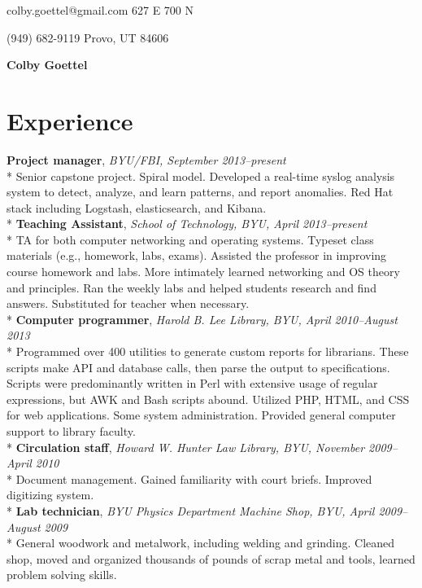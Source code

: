 \documentclass[10pt]{article}
\begin{document}
{\noindent colby.goettel@gmail.com \hfill 627 E 700 N}

{\noindent (949) 682-9119 \hfill Provo, UT 84606}
\begin{center}
    {\bfseries \huge Colby Goettel} \\
\end{center}
\vspace{-18pt}

\section*{Experience}
\textbf{Project manager}, \textit{BYU/FBI, September 2013--present} \\*
Senior capstone project. Spiral model. Developed a real-time syslog analysis system to detect, analyze, and learn patterns, and report anomalies. Red Hat stack including Logstash, elasticsearch, and Kibana. \vspace{0.5em}\\*
\textbf{Teaching Assistant}, \textit{School of Technology, BYU, April 2013--present} \\*
TA for both computer networking and operating systems. Typeset class materials (e.g., homework, labs, exams). Assisted the professor in improving course homework and labs. More intimately learned networking and OS theory and principles. Ran the weekly labs and helped students research and find answers. Substituted for teacher when necessary. \vspace{0.5em}\\*
\textbf{Computer programmer}, \textit{Harold B. Lee Library, BYU, April 2010--August 2013} \\*
Programmed over 400 utilities to generate custom reports for librarians. These scripts make API and database calls, then parse the output to specifications. Scripts were predominantly written in Perl with extensive usage of regular expressions, but AWK and Bash scripts abound. Utilized PHP, HTML, and CSS for web applications. Some system administration. Provided general computer support to library faculty. \vspace{0.5em}\\*
\textbf{Circulation staff}, \textit{Howard W. Hunter Law Library, BYU, November 2009--April 2010} \\*
Document management. Gained familiarity with court briefs. Improved digitizing system. \vspace{0.5em}\\*
\textbf{Lab technician}, \textit{BYU Physics Department Machine Shop, BYU, April 2009--August 2009} \\*
General woodwork and metalwork, including welding and grinding. Cleaned shop, moved and organized thousands of pounds of scrap metal and tools, learned problem solving skills.
\end{document}
